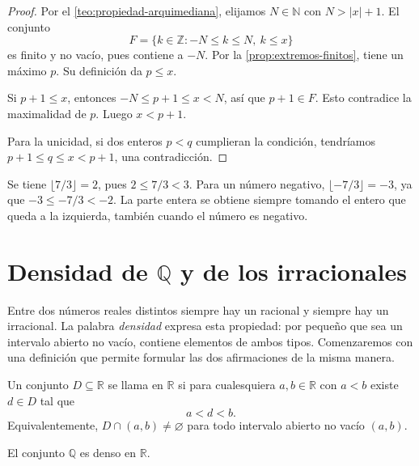 \begin{proof}
Por el \cref{teo:propiedad-arquimediana}, elijamos $N\in\mathbb{N}$ con $N>|x|+1$. El conjunto
\[
 F=\{k\in\mathbb{Z}:-N\leq k\leq N,\ k\leq x\}
\]
es finito y no vacío, pues contiene a $-N$. Por la \cref{prop:extremos-finitos}, tiene un máximo $p$. Su definición da $p\leq x$.

Si $p+1\leq x$, entonces $-N\leq p+1\leq x<N$, así que $p+1\in F$. Esto contradice la maximalidad de $p$. Luego $x<p+1$.

Para la unicidad, si dos enteros $p<q$ cumplieran la condición, tendríamos $p+1\leq q\leq x<p+1$, una contradicción.
\end{proof}

\begin{example}
Se tiene $\lfloor 7/3\rfloor=2$, pues $2\leq7/3<3$. Para un número negativo, $\lfloor-7/3\rfloor=-3$, ya que $-3\leq-7/3<-2$. La parte entera se obtiene siempre tomando el entero que queda a la izquierda, también cuando el número es negativo.
\end{example}

\section{Densidad de \texorpdfstring{$\mathbb{Q}$}{Q} y de los irracionales}
\label{sec:densidad}

Entre dos números reales distintos siempre hay un racional y siempre hay un irracional. La palabra \emph{densidad} expresa esta propiedad: por pequeño que sea un intervalo abierto no vacío, contiene elementos de ambos tipos. Comenzaremos con una definición que permite formular las dos afirmaciones de la misma manera.

\begin{samepage}
\begin{definition}
\label{def:denso}
Un conjunto $D\subseteq\mathbb{R}$ se llama  en $\mathbb{R}$ si para cualesquiera $a,b\in\mathbb{R}$ con $a<b$ existe $d\in D$ tal que
\[
 a<d<b.
\]
Equivalentemente, $D\cap(a,b)\neq\varnothing$ para todo intervalo abierto no vacío $(a,b)$.
\end{definition}
\end{samepage}

\begin{samepage}
\begin{theorem}
\label{teo:densidad-racionales}
El conjunto $\mathbb{Q}$ es denso en $\mathbb{R}$.
\end{theorem}
\end{samepage}

